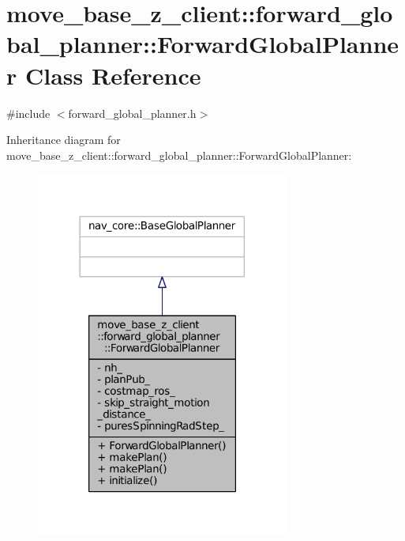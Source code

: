 \hypertarget{classmove__base__z__client_1_1forward__global__planner_1_1ForwardGlobalPlanner}{}\section{move\+\_\+base\+\_\+z\+\_\+client\+:\+:forward\+\_\+global\+\_\+planner\+:\+:Forward\+Global\+Planner Class Reference}
\label{classmove__base__z__client_1_1forward__global__planner_1_1ForwardGlobalPlanner}


{\ttfamily \#include $<$forward\+\_\+global\+\_\+planner.\+h$>$}



Inheritance diagram for move\+\_\+base\+\_\+z\+\_\+client\+:\+:forward\+\_\+global\+\_\+planner\+:\+:Forward\+Global\+Planner\+:
\nopagebreak
\begin{figure}[H]
\begin{center}
\leavevmode
\includegraphics[width=236pt]{classmove__base__z__client_1_1forward__global__planner_1_1ForwardGlobalPlanner__inherit__graph}
\end{center}
\end{figure}


